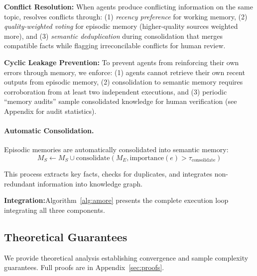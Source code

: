 \documentclass{article}
\theoremstyle{plain}
\theoremstyle{definition}
\theoremstyle{remark}
\begin{document}
\textbf{Conflict Resolution:} When agents produce conflicting information on the same topic, \uma{} resolves conflicts through: (1) \textit{recency preference} for working memory, (2) \textit{quality-weighted voting} for episodic memory (higher-quality sources weighted more), and (3) \textit{semantic deduplication} during consolidation that merges compatible facts while flagging irreconcilable conflicts for human review.

\textbf{Cyclic Leakage Prevention:} To prevent agents from reinforcing their own errors through memory, we enforce: (1) agents cannot retrieve their own recent outputs from episodic memory, (2) consolidation to semantic memory requires corroboration from at least two independent executions, and (3) periodic ``memory audits'' sample consolidated knowledge for human verification (see Appendix for audit statistics).

\paragraph{Automatic Consolidation.}

Episodic memories are automatically consolidated into semantic memory:
\begin{equation}
	M_S \leftarrow M_S \cup \text{consolidate}(M_E, \text{importance}(e) > \tau_{\text{consolidate}})
\end{equation}

This process extracts key facts, checks for duplicates, and integrates non-redundant information into knowledge graph.

\textbf{Integration:}Algorithm~\ref{alg:amore} presents the complete \amore{} execution loop integrating all three components.

 \subsection{Theoretical Guarantees}

We provide theoretical analysis establishing convergence and sample complexity guarantees. Full proofs are in Appendix~\ref{sec:proofs}.
\end{document}
